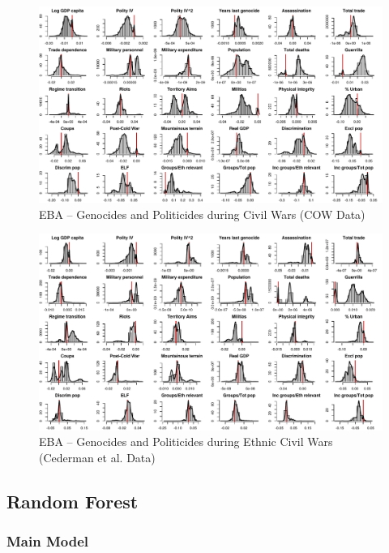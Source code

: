 \clearpage
\begin{figure}
    \centering
    \includegraphics[width=\textwidth]{images/uamk-cow.pdf}
    \caption{EBA -- Genocides and Politicides during Civil Wars (COW Data)}
    \label{fig:uamk-cow}
\end{figure}
\clearpage

\clearpage
\begin{figure}
    \centering
    \includegraphics[width=\textwidth]{images/uamk-eth.pdf}
    \caption{EBA -- Genocides and Politicides during Ethnic Civil Wars (Cederman et al. Data)}
    \label{fig:uamk-eth}
\end{figure}
\clearpage


\subsection{Random Forest}
\label{sec:mk-rfe}

\subsubsection{Main Model}

